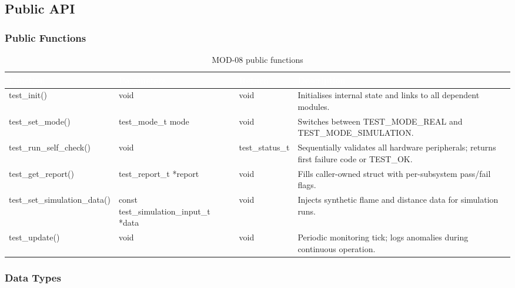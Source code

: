 \documentclass[12pt,a4paper]{article}
\newcommand{\theadtext}[1]{\textcolor{white}{\textbf{#1}}}
\newcommand{\fn}[1]{{\footnotesize\ttfamily #1}}
\begin{document}
\subsection{Public API}

\subsubsection{Public Functions}

\begin{table}[H]
\centering\small
\begin{tabularx}{\textwidth}{L{4.5cm} L{4cm} L{2.5cm} X}
\toprule
{}
\theadtext{Function} & \theadtext{Parameters} & \theadtext{Return} & \theadtext{Description} \\
\midrule
{}   \fn{test\_init()}                  & \fn{void}                               & \fn{void}            & Initialises internal state and links to all dependent modules. \\
 \fn{test\_set\_mode()}             & \fn{test\_mode\_t mode}                 & \fn{void}            & Switches between \fn{TEST\_MODE\_REAL} and \fn{TEST\_MODE\_SIMULATION}. \\
   \fn{test\_run\_self\_check()}      & \fn{void}                               & \fn{test\_status\_t} & Sequentially validates all hardware peripherals; returns first failure code or \fn{TEST\_OK}. \\
 \fn{test\_get\_report()}           & \fn{test\_report\_t *report}            & \fn{void}            & Fills caller-owned struct with per-subsystem pass/fail flags. \\
   \fn{test\_set\_simulation\_data()} & \fn{const test\_simulation\_input\_t *data} & \fn{void}        & Injects synthetic flame and distance data for simulation runs. \\
 \fn{test\_update()}                & \fn{void}                               & \fn{void}            & Periodic monitoring tick; logs anomalies during continuous operation. \\
\bottomrule
\end{tabularx}
\caption{MOD-08 public functions}
\end{table}

\subsubsection{Data Types}
\end{document}
